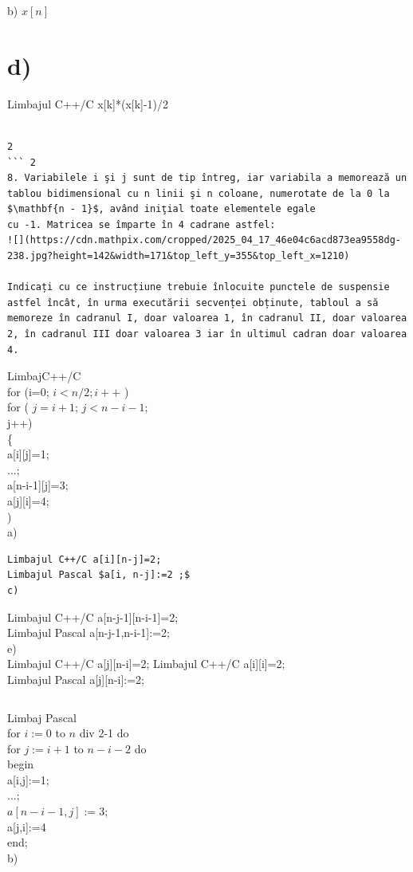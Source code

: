 \documentclass[10pt]{article}
\begin{document}
b) $x[n]$

\section*{d)}
Limbajul C++/C x[k]*(x[k]-1)/2\\
$\qquad$

\begin{verbatim}
2
``` 2
8. Variabilele i şi j sunt de tip întreg, iar variabila a memorează un tablou bidimensional cu n linii şi n coloane, numerotate de la 0 la $\mathbf{n - 1}$, având iniţial toate elementele egale
cu -1. Matricea se împarte în 4 cadrane astfel:
![](https://cdn.mathpix.com/cropped/2025_04_17_46e04c6acd873ea9558dg-238.jpg?height=142&width=171&top_left_y=355&top_left_x=1210)

Indicați cu ce instrucțiune trebuie înlocuite punctele de suspensie astfel încât, în urma executării secvenței obținute, tabloul a să memoreze în cadranul I, doar valoarea 1, în cadranul II, doar valoarea 2, în cadranul III doar valoarea 3 iar în ultimul cadran doar valoarea 4.
\end{verbatim}

LimbajC++/C\\
for (i=0; $i<n / 2 ; i++$ )\\
for ( $j=i+1$; $j<n-i-1$;\\
j++)\\
\{\\[0pt]
a[i][j]=1;\\
...;\\[0pt]
a[n-i-1][j]=3;\\[0pt]
a[j][i]=4;\\
)\\
a)

\begin{verbatim}
Limbajul C++/C a[i][n-j]=2;
Limbajul Pascal $a[i, n-j]:=2 ;$
c)
\end{verbatim}

Limbajul C++/C a[n-j-1][n-i-1]=2;\\[0pt]
Limbajul Pascal a[n-j-1,n-i-1]:=2;\\
e)\\[0pt]
Limbajul C++/C a[j][n-i]=2; Limbajul C++/C a[i][i]=2;\\[0pt]
Limbajul Pascal a[j][n-i]:=2;

\begin{verbatim}

\end{verbatim}

Limbaj Pascal\\
for $i:=0$ to $n$ div 2-1 do\\
for $j:=i+1$ to $n-i-2$ do\\
begin\\[0pt]
a[i,j]:=1;\\
...;\\
$a[n-i-1, j]:=3$;\\[0pt]
a[j,i]:=4\\
end;\\
b)
\end{document}
